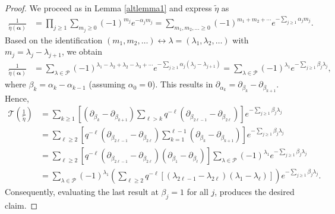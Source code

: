 \documentclass[10pt,a4paper]{amsart}
\begin{document}
\begin{proof} We proceed as in Lemma \ref{altlemma1} and express $\widetilde{\eta}$ as 
\begin{align*}  \frac1{\widetilde{\eta}(\pmb{\alpha})} & = \prod_{j\geq1} \sum_{m_j\geq0} (-1)^{m_j} e^{-\alpha_j m_j} = 
\sum_{m_1, m_2, \dots\geq0} (-1)^{m_1+m_2+\cdots} e^{-\sum_{j\geq1} \alpha_j m_j}.
\end{align*}
Based on the identification  $(m_1, m_2, \dots) \longleftrightarrow \lambda=(\lambda_1, \lambda_2, \dots)$ with $m_j=\lambda_j-\lambda_{j+1}$, we obtain
\begin{align*} \frac1{\widetilde{\eta}(\pmb{\alpha})} & = \sum_{\lambda\in\mathcal{P}} (-1)^{\lambda_1-\lambda_2+\lambda_2-\lambda_3+\cdots} e^{-\sum_{j\geq1} \alpha_j(\lambda_j-\lambda_{j+1})}
=  \sum_{\lambda\in\mathcal{P}} (-1)^{\lambda_1} e^{-\sum_{j\geq1} \beta_j \lambda_j},
\end{align*}
where $\beta_k=\alpha_k-\alpha_{k-1}$ (assuming $\alpha_0=0$). This results in $\partial_{\alpha_k} = \partial_{\beta_k}-\partial_{\beta_{k+1}}$.  Hence,
\begin{align*}  \mathcal{T} \left(\frac1{\widetilde{\eta}}\right)
 &= \sum_{k\geq1} \left[ (\partial_{\beta_k}-\partial_{\beta_{k+1}}) 
 \sum_{\ell>k}q^{-\ell} (\partial_{\beta_{2\ell-1}}-\partial_{\beta_{2\ell}}) \right] e^{-\sum_{j\geq1} \beta_j \lambda_j}  \\
 &= \sum_{\ell\geq2} \left[ q^{-\ell} (\partial_{\beta_{2\ell-1}}-\partial_{\beta_{2\ell}})  \sum_{k=1}^{\ell-1} (\partial_{\beta_k}-\partial_{\beta_{k+1}}) \right] e^{-\sum_{j\geq1} \beta_j \lambda_j}  \\
 &= \sum_{\ell\geq2} \left[ q^{-\ell} (\partial_{\beta_{2\ell-1}}-\partial_{\beta_{2\ell}})   (\partial_{\beta_1}-\partial_{\beta_{\ell}}) \right] 
\sum_{\lambda\in\mathcal{P}} (-1)^{\lambda_1} e^{-\sum_{j\geq1} \beta_j \lambda_j}  \\
&= \sum_{\lambda\in\mathcal{P}}  (-1)^{\lambda_1} \left( \sum_{\ell\geq2} q^{-\ell}
[(\lambda_{2\ell-1}-\lambda_{2\ell})(\lambda_1-\lambda_{\ell})] \right)  e^{-\sum_{j\geq1} \beta_j \lambda_j}.
\end{align*}
Consequently, evaluating the last result at $\beta_j=1$ for all $j$, produces the desired claim. 
\end{proof}
\end{document}
